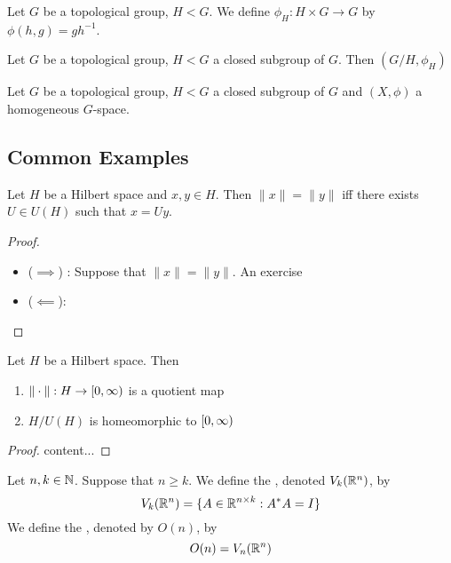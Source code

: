 \documentclass{book}
\begin{document}
	\begin{defn}
		Let $G$ be a topological group, $H < G$. We define $\phi_H: H \times G \rightarrow G$ by $\phi(h, g) = g h^{-1}$.
	\end{defn}

	\begin{ex}
		
	\end{ex}

	\begin{ex}
		Let $G$ be a topological group, $H < G$ a closed subgroup of $G$. Then $(G/H, \phi_H)$
	\end{ex}
	
	\begin{ex}
		Let $G$ be a topological group, $H < G$ a closed subgroup of $G$ and $(X, \phi)$ a homogeneous $G$-space. 
	\end{ex}
	
	
	
	
	
	
	\subsection{Common Examples}
		\begin{ex}
		Let $H$ be a Hilbert space and $x, y \in H$. Then $\| x \| = \|y\|$ iff there exists $U \in U(H)$ such that $x = Uy$.   
	\end{ex}
	
	\begin{proof}\
		\begin{itemize}
			\item ($\implies$) :
			Suppose that $\| x \| = \|y\|$. An exercise 
			\item ($\impliedby$): 
		\end{itemize}
	\end{proof}
	
	\begin{ex}
		Let $H$ be a Hilbert space. Then 
		\begin{enumerate}
			\item $\|\cdot\|: H \rightarrow [0,\infty)$ is a quotient map
			\item $H / U(H)$ is homeomorphic to $[0,\infty)$ 
		\end{enumerate} 
	\end{ex}
	
	\begin{proof}
		content...
	\end{proof}
	
	\begin{defn}
		Let $n,k \in \mathbb{N}$. Suppose that $n \geq k$.  We define the , denoted $V_k(\mathbb{R}^n)$, by 
		$$V_k(\mathbb{R}^n) = \{A \in \mathbb{R}^{n \times k}: A^* A = I\}$$ 
		We define the , denoted by $O(n)$, by 
		$$O(n) = V_n(\mathbb{R}^n)$$ 
	\end{defn}
	
\end{document}
